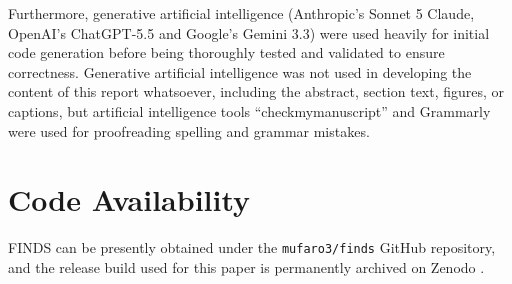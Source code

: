 \documentclass[letterpaper, 10pt, twoside]{LTJournalArticle}
\begin{document}
Furthermore, generative artificial intelligence (Anthropic's Sonnet 5 Claude,
OpenAI's ChatGPT-5.5 and Google's Gemini 3.3) were used heavily for initial
code generation before being thoroughly tested and validated to ensure
correctness. Generative artificial intelligence was not used in developing the
content of this report whatsoever, including the abstract, section text,
figures, or captions, but artificial intelligence tools ``checkmymanuscript''
and Grammarly were used for proofreading spelling and grammar mistakes.

\section*{Code Availability}
\label{section-code-availability}

FINDS can be presently obtained under the \texttt{mufaro3/finds} GitHub
repository, and the release build used for this paper is permanently archived
on Zenodo \cite{finds_zenodo_link}.

\printbibliography
\end{document}
